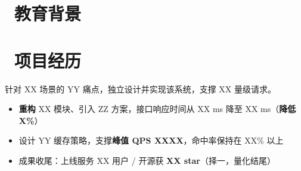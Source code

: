 \documentclass{resume}
\begin{document}


\vspace{0.5ex}

\section{\faGraduationCap\ 教育背景}


\section{\faFlask\ 项目经历}

针对 XX 场景的 YY 痛点，独立设计并实现该系统，支撑 XX 量级请求。
\begin{itemize}
  \item \textbf{重构} XX 模块、引入 ZZ 方案，接口响应时间从 XX ms 降至 XX ms（\textbf{降低 X\%}）
  \item 设计 YY 缓存策略，支撑\textbf{峰值 QPS XXXX}，命中率保持在 XX\% 以上
  \item 成果收尾：上线服务 XX 用户 / 开源获 \textbf{XX star}（择一，量化结尾）
\end{itemize}
\end{document}
